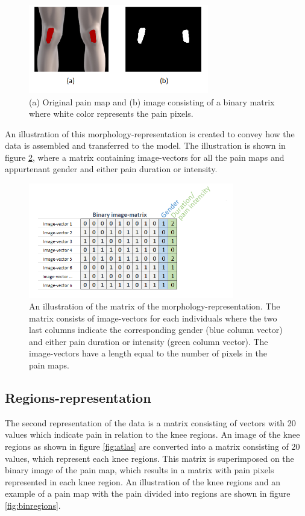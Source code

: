 \begin{figure} [H]
\centering
\includegraphics[width=0.7\textwidth]{figures/cropbin7}
\caption{(a) Original pain map and (b) image consisting of a binary matrix where white color represents the pain pixels.}
\label{fig:cropbin7}
\end{figure}

\noindent
An illustration of this morphology-representation is created to convey how the data is assembled and transferred to the model. The illustration is shown in figure \ref{fig:binmatrix}, where a matrix containing image-vectors for all the pain maps and appurtenant gender and either pain duration or intensity.

\begin{figure} [H]
\centering
\includegraphics[width=0.8\textwidth]{figures/binaryimagematrix}
\caption{An illustration of the matrix of the morphology-representation. The matrix consists of image-vectors for each individuals where the two last columns indicate the corresponding gender (blue column vector) and either pain duration or intensity (green column vector). The image-vectors have a length equal to the number of pixels in the pain maps.}
\label{fig:binmatrix}
\end{figure}


\subsection{Regions-representation} \label{sec:Regions}
The second representation of the data is a matrix consisting of vectors with 20 values which indicate pain in relation to the knee regions.
An image of the knee regions as shown in figure \ref{fig:atlas} are converted into a matrix consisting of 20 values, which represent each knee regions. This matrix is superimposed on the binary image of the pain map, which results in a matrix with pain pixels represented in each knee region. 
An illustration of the knee regions and an example of a pain map with the pain divided into regions are shown in figure \ref{fig:binregions}.

